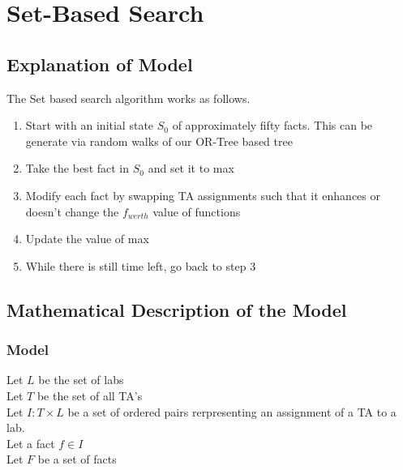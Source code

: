 \documentclass{article}
\begin{document}
\section{Set-Based Search}

\subsection{Explanation of Model}

The Set based search algorithm works as follows.

\begin{enumerate}

\item Start with an initial state $S_0$ of approximately fifty facts.
  This can be generate via random walks of our OR-Tree based tree

\item Take the best fact in $S_0$ and set it to max

\item Modify each fact by swapping TA assignments such that it
  enhances or doesn't change the $f_{werth}$ value of functions

\item Update the value of max

\item While there is still time left, go back to step 3


\end{enumerate}

\subsection{Mathematical Description of the Model}

\subsubsection{Model}

Let $L$ be the set of labs\\

Let $T$ be the set of all TA's\\

Let $I : T \times L$ be a set of ordered pairs rerpresenting an
assignment of a TA to a lab.\\

Let a fact $f \in I$\\

Let $F$ be a set of facts\\
\end{document}
